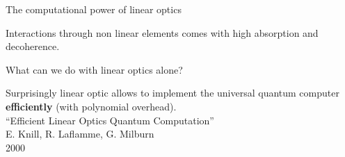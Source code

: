 \documentclass{beamer}
\begin{document}

\begin{frame}{The computational power of linear optics}
\begin{center}

Interactions through non linear elements comes with high absorption and decoherence.

\begin{block}{}
\begin{center}
What can we do with linear optics alone?
\end{center}
\end{block}
\vspace{20pt}
Surprisingly linear optic allows to implement the universal quantum computer \textbf{efficiently} (with polynomial overhead).\\
\vspace{20pt}
``Efficient Linear Optics Quantum Computation''\\
E. Knill, R. Laflamme, G. Milburn\\
2000

\end{center}
\end{frame}
\end{document}

